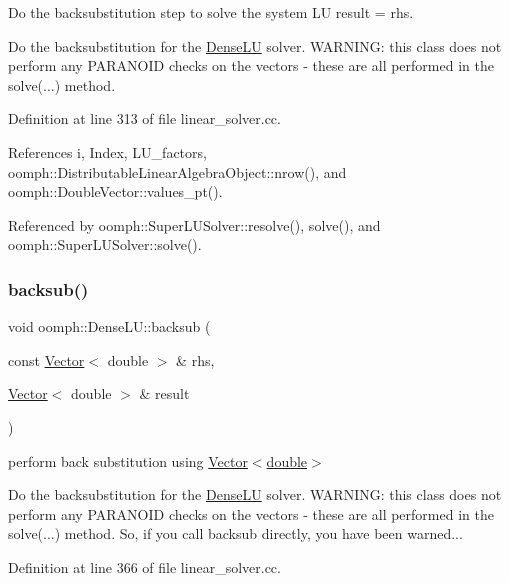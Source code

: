 Do the backsubstitution step to solve the system LU result = rhs. 

Do the backsubstitution for the \hyperlink{classoomph_1_1DenseLU}{Dense\+LU} solver. W\+A\+R\+N\+I\+NG\+: this class does not perform any P\+A\+R\+A\+N\+O\+ID checks on the vectors -\/ these are all performed in the solve(...) method. 

Definition at line 313 of file linear\+\_\+solver.\+cc.



References i, Index, L\+U\+\_\+factors, oomph\+::\+Distributable\+Linear\+Algebra\+Object\+::nrow(), and oomph\+::\+Double\+Vector\+::values\+\_\+pt().



Referenced by oomph\+::\+Super\+L\+U\+Solver\+::resolve(), solve(), and oomph\+::\+Super\+L\+U\+Solver\+::solve().

\mbox{\label{classoomph_1_1DenseLU_acef3a68bf4e28465a7c316dba135f504}} 
\subsubsection{\texorpdfstring{backsub()}{backsub()}\hspace{0.1cm}{\footnotesize\ttfamily [2/2]}}
{\footnotesize\ttfamily void oomph\+::\+Dense\+L\+U\+::backsub (\begin{DoxyParamCaption}\item[{const \hyperlink{classoomph_1_1Vector}{Vector}$<$ double $>$ \&}]{rhs,  }\item[{\hyperlink{classoomph_1_1Vector}{Vector}$<$ double $>$ \&}]{result }\end{DoxyParamCaption})\hspace{0.3cm}{\ttfamily [protected]}}



perform back substitution using \hyperlink{classoomph_1_1Vector}{Vector$<$double$>$} 

Do the backsubstitution for the \hyperlink{classoomph_1_1DenseLU}{Dense\+LU} solver. W\+A\+R\+N\+I\+NG\+: this class does not perform any P\+A\+R\+A\+N\+O\+ID checks on the vectors -\/ these are all performed in the solve(...) method. So, if you call backsub directly, you have been warned... 

Definition at line 366 of file linear\+\_\+solver.\+cc.



